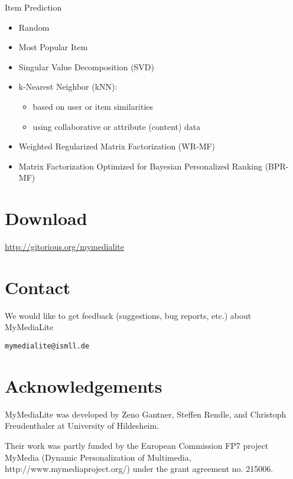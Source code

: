 \documentclass[a4paper, foldmark, 12pt]{leaflet}
\begin{document}
Item Prediction
\begin{itemize}
	\item Random
	\item Most Popular Item
	\item Singular Value Decomposition (SVD)
	\item k-Nearest Neighbor (kNN):
		\begin{itemize}
			\item based on user or item similarities
			\item using collaborative or attribute (content) data
		\end{itemize}
	\item Weighted Regularized Matrix Factorization (WR-MF)
	\item Matrix Factorization Optimized for Bayesian Personalized Ranking (BPR-MF)
\end{itemize}

\newpage

\section{Download}
\begin{center}
	\url{http://gitorious.org/mymedialite}
\end{center}

\section{Contact}
We would like to get feedback (suggestions, bug reports, etc.) about MyMediaLite
\begin{center}
	\texttt{mymedialite@ismll.de}
\end{center}

\section{Acknowledgements}
MyMediaLite was developed by Zeno Gantner, Steffen Rendle, and Christoph Freudenthaler
at University of Hildesheim.

Their work was partly funded by the European Commission FP7 project MyMedia
(Dynamic Personalization of Multimedia, http://www.mymediaproject.org/)
under the grant agreement no. 215006.
\end{document}
